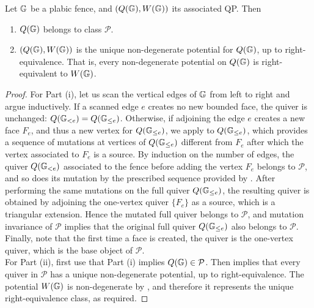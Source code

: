\begin{lemma}\label{prop:P}
Let $\mathbb G$ be a plabic fence, and $(Q(\mathbb G),W(\mathbb G))$ its associated QP. Then
\begin{enumerate}[label=$(\roman*)$]
    \item $Q(\mathbb G)$ belongs to class $\mathcal P$.

    \item $(Q(\mathbb G),W(\mathbb G))$ is the unique non-degenerate potential for $Q(\mathbb G)$, up to right-equivalence. That is, every non-degenerate potential on $Q(\mathbb G)$ is right-equivalent to $W(\mathbb G)$.
\end{enumerate}

\end{lemma}

\begin{proof}
For Part (i), let us scan the vertical edges of $\mathbb G$ from left to right and argue inductively.  If a scanned edge $e$ creates no new bounded face, the quiver is unchanged: $Q(\mathbb G_{<e})=Q(\mathbb G_{\leq e})$.  Otherwise, if adjoining the edge $e$ creates a new face $F_e$, and thus a new vertex for $Q(\mathbb G_{\leq e})$, we apply \cite[Lemma 3.8]{CasalsGao} to $Q(\mathbb G_{\leq e})$, which provides a sequence of mutations at vertices of $Q(\mathbb G_{\leq e})$ different from $F_e$ after which the vertex associated to $F_e$ is a source. By induction on the number of edges, the quiver $Q(\mathbb G_{<e})$ associated to the fence before adding the vertex $F_e$ belongs to $\mathcal P$, and so does its mutation by the prescribed sequence provided by \cite[Lemma 3.8]{CasalsGao}. After performing the same mutations on the full quiver $Q(\mathbb G_{\leq e})$, the resulting quiver is obtained by adjoining the one-vertex quiver $\{F_e\}$ as a source, which is a triangular extension. Hence the mutated full quiver belongs to $\mathcal P$, and mutation invariance of $\mathcal P$ implies that the original full quiver $Q(\mathbb G_{\leq e})$ also belongs to $\mathcal P$. Finally, note that the first time a face is created, the quiver is the one-vertex quiver, which is the base object of $\mathcal P$.\\

For Part (ii), first use that Part (i) implies $Q(\mathbb G)\in\mathcal P$. Then \cite[Theorem~4.6]{Ladkani} implies that every quiver in $\mathcal P$ has a unique non-degenerate potential, up to right-equivalence.  The potential $W(\mathbb G)$ is non-degenerate by \cite[Proposition~3.11]{CasalsGao}, and therefore it represents the unique right-equivalence class, as required.
\end{proof}

